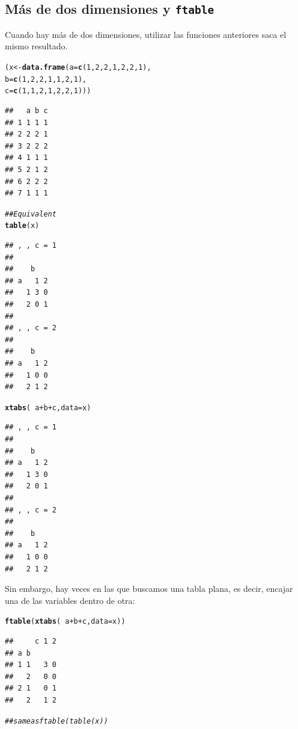 \documentclass{config/apuntes}\usepackage[]{graphicx}\usepackage[]{xcolor}
\makeatletter
\newcommand{\hlnum}[1]{\textcolor[rgb]{0.686,0.059,0.569}{#1}}%
\newcommand{\hlcom}[1]{\textcolor[rgb]{0.678,0.584,0.686}{\textit{#1}}}%
\newcommand{\hlopt}[1]{\textcolor[rgb]{0,0,0}{#1}}%
\newcommand{\hldef}[1]{\textcolor[rgb]{0.345,0.345,0.345}{#1}}%
\newcommand{\hlkwb}[1]{\textcolor[rgb]{0.69,0.353,0.396}{#1}}%
\newcommand{\hlkwc}[1]{\textcolor[rgb]{0.333,0.667,0.333}{#1}}%
\newcommand{\hlkwd}[1]{\textcolor[rgb]{0.737,0.353,0.396}{\textbf{#1}}}%
\newenvironment{kframe}{%
 \def\at@end@of@kframe{}%
 \ifinner\ifhmode%
  \def\at@end@of@kframe{\end{minipage}}%
  \begin{minipage}{\columnwidth}%
 \fi\fi%
 \def\FrameCommand##1{\hskip\@totalleftmargin \hskip-\fboxsep
 \colorbox{shadecolor}{##1}\hskip-\fboxsep
     \hskip-\linewidth \hskip-\@totalleftmargin \hskip\columnwidth}%
 \MakeFramed {\advance\hsize-\width
   \@totalleftmargin\z@ \linewidth\hsize
   \@setminipage}}%
 {\par\unskip\endMakeFramed%
 \at@end@of@kframe}
\newenvironment{knitrout}{}{} %
\newcommand{\code}[1]{\texttt{#1}}
\makeatother
\begin{document}
\subsection{Más de dos dimensiones y \code{ftable}}
Cuando hay más de dos dimensiones, utilizar las funciones anteriores saca el mismo resultado. 
\begin{knitrout}
\color{fgcolor}\begin{kframe}
\begin{alltt}
\hldef{(x} \hlkwb{<-}  \hlkwd{data.frame}\hldef{(}\hlkwc{a} \hldef{=} \hlkwd{c}\hldef{(}\hlnum{1}\hldef{,}\hlnum{2}\hldef{,}\hlnum{2}\hldef{,}\hlnum{1}\hldef{,}\hlnum{2}\hldef{,}\hlnum{2}\hldef{,}\hlnum{1}\hldef{),}
                 \hlkwc{b} \hldef{=} \hlkwd{c}\hldef{(}\hlnum{1}\hldef{,}\hlnum{2}\hldef{,}\hlnum{2}\hldef{,}\hlnum{1}\hldef{,}\hlnum{1}\hldef{,}\hlnum{2}\hldef{,}\hlnum{1}\hldef{),}
                 \hlkwc{c} \hldef{=} \hlkwd{c}\hldef{(}\hlnum{1}\hldef{,}\hlnum{1}\hldef{,}\hlnum{2}\hldef{,}\hlnum{1}\hldef{,}\hlnum{2}\hldef{,}\hlnum{2}\hldef{,}\hlnum{1}\hldef{)))}
\end{alltt}
\begin{verbatim}
##   a b c
## 1 1 1 1
## 2 2 2 1
## 3 2 2 2
## 4 1 1 1
## 5 2 1 2
## 6 2 2 2
## 7 1 1 1
\end{verbatim}
\begin{alltt}
\hlcom{## Equivalent}
\hlkwd{table}\hldef{(x)}
\end{alltt}
\begin{verbatim}
## , , c = 1
## 
##    b
## a   1 2
##   1 3 0
##   2 0 1
## 
## , , c = 2
## 
##    b
## a   1 2
##   1 0 0
##   2 1 2
\end{verbatim}
\begin{alltt}
\hlkwd{xtabs}\hldef{(}\hlopt{~} \hldef{a} \hlopt{+} \hldef{b} \hlopt{+} \hldef{c,} \hlkwc{data} \hldef{= x)}
\end{alltt}
\begin{verbatim}
## , , c = 1
## 
##    b
## a   1 2
##   1 3 0
##   2 0 1
## 
## , , c = 2
## 
##    b
## a   1 2
##   1 0 0
##   2 1 2
\end{verbatim}
\end{kframe}
\end{knitrout}

Sin embargo, hay veces en las que buscamos una tabla plana, es decir, encajar una de las variables dentro de otra:
\begin{knitrout}
\color{fgcolor}\begin{kframe}
\begin{alltt}
\hlkwd{ftable}\hldef{(}\hlkwd{xtabs}\hldef{(}\hlopt{~} \hldef{a} \hlopt{+} \hldef{b} \hlopt{+} \hldef{c,} \hlkwc{data} \hldef{= x))}
\end{alltt}
\begin{verbatim}
##     c 1 2
## a b      
## 1 1   3 0
##   2   0 0
## 2 1   0 1
##   2   1 2
\end{verbatim}
\begin{alltt}
\hlcom{## same as ftable(table(x))}
\end{alltt}
\end{kframe}
\end{knitrout}
\end{document}
